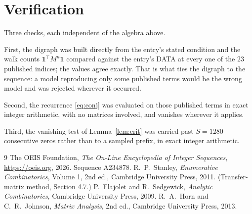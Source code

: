 \documentclass[11pt,a4paper]{article}
\theoremstyle{plain}
\theoremstyle{definition}
\begin{document}
\section{Verification}

Three checks, each independent of the algebra above.

First, the digraph was built directly from the entry's stated condition and the walk counts
$\mathbf{1}^{\!\top}M^{n}\mathbf{1}$ compared against the entry's DATA at every one of
the $23$ published indices; the values agree exactly. That is what ties the digraph to
the sequence: a model reproducing only some published terms would be the wrong model and
was rejected wherever it occurred.

Second, the recurrence \eqref{eq:conj} was evaluated on those published terms in exact
integer arithmetic, with no matrices involved, and vanishes wherever it applies.

Third, the vanishing test of Lemma~\ref{lem:crit} was carried past $S=1280$ consecutive
zeros rather than to a sampled prefix, in exact integer arithmetic.

\begin{thebibliography}{9}
 The OEIS Foundation, \emph{The On-Line Encyclopedia of Integer
Sequences}, \url{https://oeis.org}, 2026. Sequence A234878.
 R.~P.~Stanley, \emph{Enumerative Combinatorics}, Volume 1, 2nd ed.,
Cambridge University Press, 2011. (Transfer-matrix method, Section 4.7.)
 P.~Flajolet and R.~Sedgewick, \emph{Analytic Combinatorics}, Cambridge
University Press, 2009.
 R.~A.~Horn and C.~R.~Johnson, \emph{Matrix Analysis}, 2nd ed., Cambridge
University Press, 2013.
\end{thebibliography}
\end{document}
